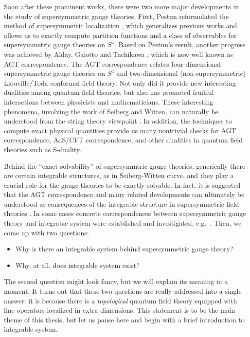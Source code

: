 Soon after these prominent works, there were two more major developments in the study of
supersymmetric gauge theories.
First, Pestun reformulated the method of supersymmetric localization \cite{Pestun:2007rz},
which generalizes previous works and allows us to exactly compute partition functions
and a class of observables for supersymmetric gauge theories on $S^4$.
Based on Pestun's result, another progress was achieved by
Alday, Gaiotto and Tachikawa \cite{Alday:2009aq}, which
is now well known as AGT correspondence.
The AGT correspondence relates four-dimensional supersymmetric gauge theories on $S^4$ and
two-dimensional (non-supersymmetric) Liouville/Toda conformal field theory.
Not only did it provide new interesting dualities among quantum field theories,
but also has promoted fruitful interactions between physicists and mathematicians.
These interesting phenomena, involving the work of Seiberg and Witten,
can naturally be understood from the string theory viewpoint \cite{Witten:1997sc,Gaiotto:2009we}.
In addition, the techniques to compute exact physical quantities provide us many nontrivial checks
for AGT correspondence, AdS/CFT correspondence,
and other dualities in quantum field theories such as S-duality.


Behind the ``exact solvability'' of supersymmtric gauge theories, generically there are certain integrable
structures, as in Seiberg-Witten curve, and they play a crucial role for the gauge theories to be
exactly solvable.
In fact, it is suggested that the AGT correspondence and many related developments can ultimately
be understood as consequences of the integrable structure in
supersymmetric field theories \cite{Gaiotto:2009hg,Teschner:2010je}.
In some cases concrete correspondences between
supersymmetric gauge theory and integrable system were established and investigated,
e.g.~\cite{Nekrasov:2009uh,Nekrasov:2009ui,Nekrasov:2009rc,Nekrasov:2010ka,Nekrasov:2011bc,Yamazaki:2012cp,Terashima:2012cx,Yamazaki:2013nra,Nekrasov:2015wsu}.
Then, we come up with two questions:
\begin{itemize}
    \item Why is there an integrable system behind supersymmetric gauge theory?
    \item Why, at all, does integrable system exist?
\end{itemize}
The second question might look fancy, but we will explain its meaning in a moment.
It turns out that these two questions are really addressed into a single answer:
it is because there is a \emph{topological} quantum field theory
equipped with line operators localized in extra dimensions.
This statement is to be the main theme of this thesis, but let us pause here and
begin with a brief introduction
to integrable system.


